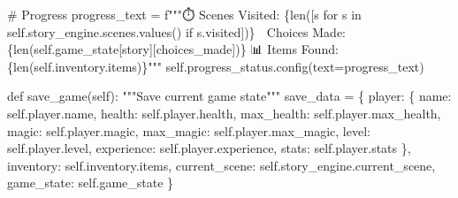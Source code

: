 \documentclass[
  letterpaper,
  DIV=11,
  numbers=noendperiod,
  oneside]{scrreprt}
\newenvironment{Shaded}{}{}
\newcommand{\BuiltInTok}[1]{\textcolor[rgb]{0.84,0.23,0.29}{#1}}
\newcommand{\CommentTok}[1]{\textcolor[rgb]{0.42,0.45,0.49}{#1}}
\newcommand{\ControlFlowTok}[1]{\textcolor[rgb]{0.84,0.23,0.29}{#1}}
\newcommand{\KeywordTok}[1]{\textcolor[rgb]{0.84,0.23,0.29}{#1}}
\newcommand{\NormalTok}[1]{\textcolor[rgb]{0.14,0.16,0.18}{#1}}
\newcommand{\OperatorTok}[1]{\textcolor[rgb]{0.14,0.16,0.18}{#1}}
\newcommand{\SpecialCharTok}[1]{\textcolor[rgb]{0.00,0.36,0.77}{#1}}
\newcommand{\SpecialStringTok}[1]{\textcolor[rgb]{0.01,0.18,0.38}{#1}}
\newcommand{\StringTok}[1]{\textcolor[rgb]{0.01,0.18,0.38}{#1}}
\newcommand{\VariableTok}[1]{\textcolor[rgb]{0.89,0.38,0.04}{#1}}
\begin{document}
\begin{Shaded}
\begin{Highlighting}[]
        \CommentTok{\# Progress}
\NormalTok{        progress\_text }\OperatorTok{=} \SpecialStringTok{f"""⏱️ Scenes Visited: }\SpecialCharTok{\{}\BuiltInTok{len}\NormalTok{([s }\ControlFlowTok{for}\NormalTok{ s }\KeywordTok{in} \VariableTok{self}\NormalTok{.story\_engine.scenes.values() }\ControlFlowTok{if}\NormalTok{ s.visited])}\SpecialCharTok{\}}
\SpecialStringTok{🎯 Choices Made: }\SpecialCharTok{\{}\BuiltInTok{len}\NormalTok{(}\VariableTok{self}\NormalTok{.game\_state[}\StringTok{\textquotesingle{}story\textquotesingle{}}\NormalTok{][}\StringTok{\textquotesingle{}choices\_made\textquotesingle{}}\NormalTok{])}\SpecialCharTok{\}}
\SpecialStringTok{📊 Items Found: }\SpecialCharTok{\{}\BuiltInTok{len}\NormalTok{(}\VariableTok{self}\NormalTok{.inventory.items)}\SpecialCharTok{\}}\SpecialStringTok{"""}
        \VariableTok{self}\NormalTok{.progress\_status.config(text}\OperatorTok{=}\NormalTok{progress\_text)}

    \KeywordTok{def}\NormalTok{ save\_game(}\VariableTok{self}\NormalTok{):}
        \CommentTok{"""Save current game state"""}
\NormalTok{        save\_data }\OperatorTok{=}\NormalTok{ \{}
            \StringTok{\textquotesingle{}player\textquotesingle{}}\NormalTok{: \{}
                \StringTok{\textquotesingle{}name\textquotesingle{}}\NormalTok{: }\VariableTok{self}\NormalTok{.player.name,}
                \StringTok{\textquotesingle{}health\textquotesingle{}}\NormalTok{: }\VariableTok{self}\NormalTok{.player.health,}
                \StringTok{\textquotesingle{}max\_health\textquotesingle{}}\NormalTok{: }\VariableTok{self}\NormalTok{.player.max\_health,}
                \StringTok{\textquotesingle{}magic\textquotesingle{}}\NormalTok{: }\VariableTok{self}\NormalTok{.player.magic,}
                \StringTok{\textquotesingle{}max\_magic\textquotesingle{}}\NormalTok{: }\VariableTok{self}\NormalTok{.player.max\_magic,}
                \StringTok{\textquotesingle{}level\textquotesingle{}}\NormalTok{: }\VariableTok{self}\NormalTok{.player.level,}
                \StringTok{\textquotesingle{}experience\textquotesingle{}}\NormalTok{: }\VariableTok{self}\NormalTok{.player.experience,}
                \StringTok{\textquotesingle{}stats\textquotesingle{}}\NormalTok{: }\VariableTok{self}\NormalTok{.player.stats}
\NormalTok{            \},}
            \StringTok{\textquotesingle{}inventory\textquotesingle{}}\NormalTok{: }\VariableTok{self}\NormalTok{.inventory.items,}
            \StringTok{\textquotesingle{}current\_scene\textquotesingle{}}\NormalTok{: }\VariableTok{self}\NormalTok{.story\_engine.current\_scene,}
            \StringTok{\textquotesingle{}game\_state\textquotesingle{}}\NormalTok{: }\VariableTok{self}\NormalTok{.game\_state}
\NormalTok{        \}}
        

\end{Highlighting}
\end{Shaded}
\end{document}
